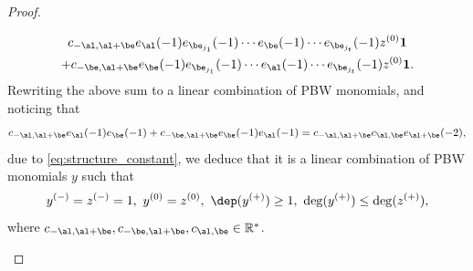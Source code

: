 \begin{proof}
\begin{itemize}
\begin{multline*}
c_{-\al,\al+\be}e_{\al}(-1)e_{\be_{j_1}}(-1) \cdots e_{\be}(-1)\cdots e_{\be_{j_t}}(-1) z^{(0)} \mathbf{1}\\
+c_{-\be,\al+\be}e_{\be}(-1)e_{\be_{j_1}}(-1) \cdots e_{\al}(-1)\cdots e_{\be_{j_t}}(-1) z^{(0)} \mathbf{1}.
\end{multline*}
Rewriting the above sum to a linear combination of PBW monomials, and noticing that
\[
c_{-\al,\al+\be}e_{\al}(-1)e_{\be}(-1)+c_{-\be,\al+\be}e_{\be}(-1)e_{\al}(-1)=c_{-\al,\al+\be}c_{\al,\be}e_{\al+\be}(-2),
\]
due to \eqref{eq:structure_constant},
we deduce that it is a linear combination of PBW monomials $y$ such that
\begin{equation}\label{e43}y^{(-)}=z^{(-)}=1, \ y^{(0)}=z^{(0)}, \ \dep(y^{(+)})\geq 1, \ \deg(y^{(+)})\leq \deg(z^{(+)}),
\end{equation}
where $c_{-\al,\al+\be}, c_{-\be,\al+\be}, c_{\al,\be}\in {\mathbb R}^*$.


\end{itemize}
\end{proof}
